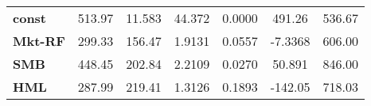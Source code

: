 \begin{center}
\begin{tabular}{lcccccc}
\midrule
\textbf{const}  &       513.97       &       11.583       &      44.372     &      0.0000      &       491.26      &       536.67       \\
\textbf{Mkt-RF} &       299.33       &       156.47       &      1.9131     &      0.0557      &      -7.3368      &       606.00       \\
\textbf{SMB}    &       448.45       &       202.84       &      2.2109     &      0.0270      &       50.891      &       846.00       \\
\textbf{HML}    &       287.99       &       219.41       &      1.3126     &      0.1893      &      -142.05      &       718.03       \\
\bottomrule
\end{tabular}
\end{center}
